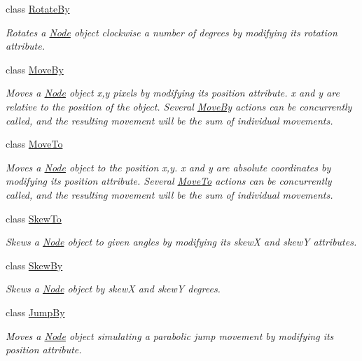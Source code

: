 \begin{DoxyCompactItemize}
class \hyperlink{classRotateBy}{Rotate\+By}
\begin{DoxyCompactList}\small\item\em Rotates a \hyperlink{classNode}{Node} object clockwise a number of degrees by modifying it\textquotesingle{}s rotation attribute. \end{DoxyCompactList}\item 
class \hyperlink{classMoveBy}{Move\+By}
\begin{DoxyCompactList}\small\item\em Moves a \hyperlink{classNode}{Node} object x,y pixels by modifying it\textquotesingle{}s position attribute. x and y are relative to the position of the object. Several \hyperlink{classMoveBy}{Move\+By} actions can be concurrently called, and the resulting movement will be the sum of individual movements. \end{DoxyCompactList}\item 
class \hyperlink{classMoveTo}{Move\+To}
\begin{DoxyCompactList}\small\item\em Moves a \hyperlink{classNode}{Node} object to the position x,y. x and y are absolute coordinates by modifying it\textquotesingle{}s position attribute. Several \hyperlink{classMoveTo}{Move\+To} actions can be concurrently called, and the resulting movement will be the sum of individual movements. \end{DoxyCompactList}\item 
class \hyperlink{classSkewTo}{Skew\+To}
\begin{DoxyCompactList}\small\item\em Skews a \hyperlink{classNode}{Node} object to given angles by modifying it\textquotesingle{}s skewX and skewY attributes. \end{DoxyCompactList}\item 
class \hyperlink{classSkewBy}{Skew\+By}
\begin{DoxyCompactList}\small\item\em Skews a \hyperlink{classNode}{Node} object by skewX and skewY degrees. \end{DoxyCompactList}\item 
class \hyperlink{classJumpBy}{Jump\+By}
\begin{DoxyCompactList}\small\item\em Moves a \hyperlink{classNode}{Node} object simulating a parabolic jump movement by modifying it\textquotesingle{}s position attribute. \end{DoxyCompactList}\item 

\end{DoxyCompactItemize}

